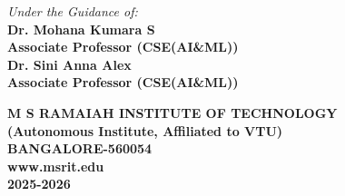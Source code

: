 \begin{titlepage}
\centering
\textit{Under the Guidance of:}\\

\bf{Dr. Mohana Kumara S}\\
Associate Professor (CSE(AI\&ML))\\
\bf{Dr. Sini Anna Alex}\\
Associate Professor (CSE(AI\&ML))\\ 
\vspace{12mm}
 \begin{center}
 
     \linespread{0.3}
    \Large\bf{M S RAMAIAH INSTITUTE OF TECHNOLOGY}\\
    \vspace{2mm}
    \normalfont(Autonomous Institute, Affiliated to VTU)\\
    \vspace{2mm}
BANGALORE-560054\\
\vspace{2mm}
www.msrit.edu\\
\vspace{2mm}
2025-2026\\
\end{center}
\end{titlepage}	
